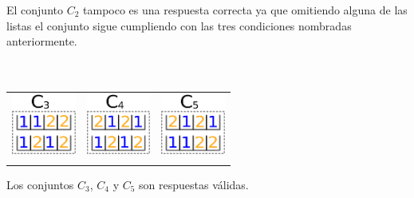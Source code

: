  El conjunto $C_{2}$ tampoco es una respuesta correcta ya que omitiendo alguna de las listas el conjunto sigue cumpliendo con las tres condiciones nombradas anteriormente. \\
 \\
 \\

{\begin{tabular}{ccc}
   \includegraphics[height=2cm]{graficos/c3.png} & \includegraphics[height=2cm]{graficos/c4.png} & \includegraphics[height=2cm]{graficos/c5.png} \\
   \\

\end{tabular}}

  Los conjuntos $C_{3}$, $C_{4}$ y $C_{5}$ son respuestas válidas. 




